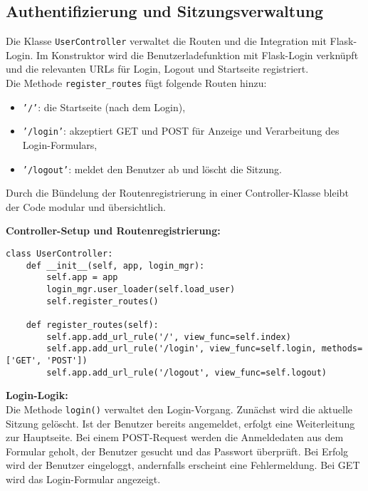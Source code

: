 \documentclass[12pt]{article}
\begin{document}
\subsection{Authentifizierung und Sitzungsverwaltung}

Die Klasse \texttt{UserController} verwaltet die Routen und die Integration mit Flask-Login. Im Konstruktor wird die Benutzerladefunktion mit Flask-Login verknüpft und die relevanten URLs für Login, Logout und Startseite registriert.\\

Die Methode \texttt{register\_routes} fügt folgende Routen hinzu:
\begin{itemize}
  \item \texttt{'/'}: die Startseite (nach dem Login),
  \item \texttt{'/login'}: akzeptiert GET und POST für Anzeige und Verarbeitung des Login-Formulars,
  \item \texttt{'/logout'}: meldet den Benutzer ab und löscht die Sitzung.
\end{itemize}

\noindent Durch die Bündelung der Routenregistrierung in einer Controller-Klasse bleibt der Code modular und übersichtlich.

\newpage
\noindent \textbf{Controller-Setup und Routenregistrierung:} \\
\begin{verbatim}
class UserController:
    def __init__(self, app, login_mgr):
        self.app = app
        login_mgr.user_loader(self.load_user)
        self.register_routes()

    def register_routes(self):
        self.app.add_url_rule('/', view_func=self.index)
        self.app.add_url_rule('/login', view_func=self.login, methods=['GET', 'POST'])
        self.app.add_url_rule('/logout', view_func=self.logout)
\end{verbatim} 
\vspace{1em}
\noindent \textbf{Login-Logik:} \\

\noindent Die Methode \texttt{login()} verwaltet den Login-Vorgang. Zunächst wird die aktuelle Sitzung gelöscht. Ist der Benutzer bereits angemeldet, erfolgt eine Weiterleitung zur Hauptseite. Bei einem POST-Request werden die Anmeldedaten aus dem Formular geholt, der Benutzer gesucht und das Passwort überprüft. Bei Erfolg wird der Benutzer eingeloggt, andernfalls erscheint eine Fehlermeldung. Bei GET wird das Login-Formular angezeigt.
\end{document}
